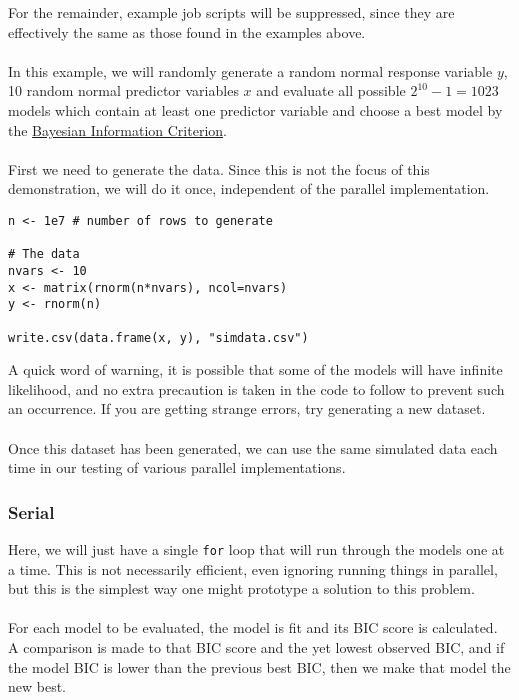 For the remainder, example job scripts will be suppressed, since they are effectively the same as those found in the examples above.\\\\
%
In this example, we will randomly generate a random normal response variable $y$, 10 random normal predictor variables $x$ and evaluate all possible $2^{10} -1 = 1023$ models which contain at least one predictor variable and choose a best model by the \href{https://en.wikipedia.org/wiki/Bayesian_information_criterion}{Bayesian Information Criterion}.\\\\
%
First we need to generate the data.  Since this is not the focus of this demonstration, we will do it once, independent of the parallel implementation.  
\begin{lstlisting}[language=rr]
n <- 1e7 # number of rows to generate

# The data
nvars <- 10
x <- matrix(rnorm(n*nvars), ncol=nvars)
y <- rnorm(n)

write.csv(data.frame(x, y), "simdata.csv")
\end{lstlisting}
A quick word of warning, it is possible that some of the models will have infinite likelihood, and no extra precaution is taken in the code to follow to prevent such an occurrence.  If you are getting strange errors, try generating a new dataset.  \\\\
%
Once this dataset has been generated, we can use the same simulated data each time in our testing of various parallel implementations.

\subsubsection{Serial}
Here, we will just have a single \texttt{for} loop that will run through the models one at a time.  This is not necessarily efficient, even ignoring running things in parallel, but this is the simplest way one might prototype a solution to this problem.  \\\\
%
For each model to be evaluated, the model is fit and its BIC score is calculated.  A comparison is made to that BIC score and the yet lowest observed BIC, and if the model BIC is lower than the previous best BIC, then we make that model the new best.

